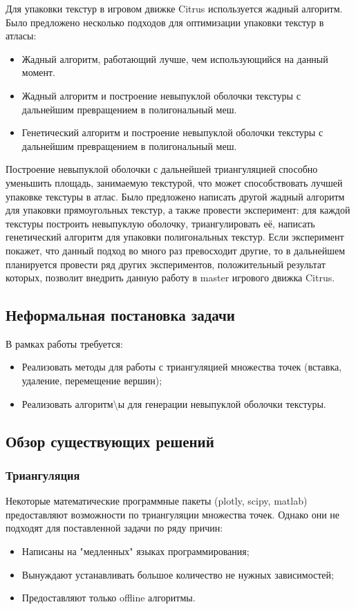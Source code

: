 \documentclass{fefu}
\begin{document}
Для упаковки текстур в игровом движке Citrus используется жадный алгоритм. Было предложено несколько подходов для
оптимизации упаковки текстур в атласы:
\begin{itemize}
    \item Жадный алгоритм, работающий лучше, чем использующийся на данный момент.
    \item Жадный алгоритм и построение невыпуклой оболочки текстуры с дальнейшим превращением в полигональный меш.
    \item Генетический алгоритм и построение невыпуклой оболочки текстуры с дальнейшим превращением в полигональный меш.
\end{itemize}

Построение невыпуклой оболочки с дальнейшей триангуляцией способно уменьшить площадь, занимаемую текстурой, что
может способствовать лучшей упаковке текстуры в атлас. Было предложено написать другой жадный алгоритм для упаковки
прямоугольных текстур, а также провести эксперимент: для каждой текстуры построить невыпуклую оболочку, триангулировать
её, написать генетический алгоритм для упаковки полигональных текстур. Если эксперимент покажет, что данный подход во
много раз превосходит другие, то в дальнейшем планируется провести ряд других экспериментов, положительный результат
которых, позволит внедрить данную работу в master игрового движка Citrus.
\subsection{Неформальная постановка задачи}
В рамках работы требуется:
\begin{itemize}
    \item Реализовать методы для работы с триангуляцией множества точек (вставка, удаление, перемещение вершин);
    \item Реализовать алгоритм\textbackslash ы для генерации невыпуклой оболочки текстуры.
\end{itemize}
\subsection{Обзор существующих решений}
\subsubsection{Триангуляция}
Некоторые математические программные пакеты (plotly, scipy, matlab) предоставляют возможности по триангуляции
множества точек. Однако они не подходят для поставленной задачи по ряду причин:
\begin{itemize}
    \item Написаны на "медленных" языках программирования;
    \item Вынуждают устанавливать большое количество не нужных зависимостей;
    \item Предоставляют только offline алгоритмы.
\end{itemize}
\end{document}
